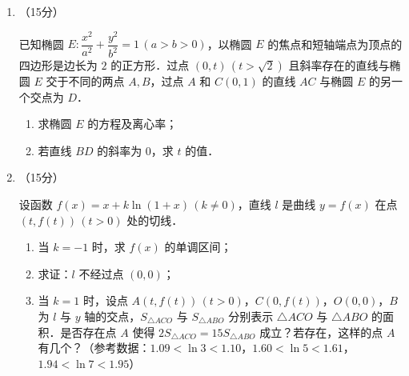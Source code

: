 \begin{description}
\begin{enumerate}[leftmargin=5pt]
        假设：一份保单的保费为 $0.4$ 万元；前三次索赔时，保险公司每次赔偿 $0.8$ 万元；第四次索赔时，保险公司赔偿 $0.6$ 万元．假设不同保单的索赔次数相互独立．用频率估计概率．

        \begin{enumerate}[label=(\arabic*)]
            \item 估计一份保单索赔次数不少于 $2$ 的概率；
            \item 一份保单的毛利润定义为这份保单的保费与赔偿总金额之差．
            \begin{enumerate}[label=\textcircled{\arabic*}]
                \item 记 $X$ 为一份保单的毛利润，估计 $X$ 的数学期望 $EX$；
                \item 如果无索赔的保单的保费减少 $4\%$，有索赔的保单的保费增加 $20\%$，试比较这种情况下一份保单毛利润的数学期望估计值与中 $EX$ 估计值的大小．（结论不要求证明）
            \end{enumerate}
        \end{enumerate}

        \item （15分）

        已知椭圆 $E:\dfrac{x^2}{a^2}+\dfrac{y^2}{b^2}=1\,(a>b>0)$，以椭圆 $E$ 的焦点和短轴端点为顶点的四边形是边长为 $2$ 的正方形．过点 $(0,t)\,(t>\sqrt{2})$ 且斜率存在的直线与椭圆 $E$ 交于不同的两点 $A,B$，过点 $A$ 和 $C(0,1)$ 的直线 $AC$ 与椭圆 $E$ 的另一个交点为 $D$．

        \begin{enumerate}[label=(\arabic*)]
            \item 求椭圆 $E$ 的方程及离心率；
            \item 若直线 $BD$ 的斜率为 $0$，求 $t$ 的值．
        \end{enumerate}

        \item （15分）

        设函数 $f(x)=x+k\ln(1+x)\,(k\neq0)$，直线 $l$ 是曲线 $y=f(x)$ 在点 $(t,f(t))\,(t>0)$ 处的切线．

        \begin{enumerate}[label=(\arabic*)]
            \item 当 $k=-1$ 时，求 $f(x)$ 的单调区间；
            \item 求证：$l$ 不经过点 $(0,0)$；
            \item 当 $k=1$ 时，设点 $A(t,f(t))\,(t>0)$，$C(0,f(t))$，$O(0,0)$，$B$ 为 $l$ 与 $y$ 轴的交点，$S_{\triangle ACO}$ 与 $S_{\triangle ABO}$ 分别表示 $\triangle ACO$ 与 $\triangle ABO$ 的面积．是否存在点 $A$ 使得 $2S_{\triangle ACO}=15S_{\triangle ABO}$ 成立？若存在，这样的点 $A$ 有几个？（参考数据：$1.09<\ln3<1.10$，$1.60<\ln5<1.61$，$1.94<\ln7<1.95$）
        \end{enumerate}


\end{enumerate}
\end{description}
